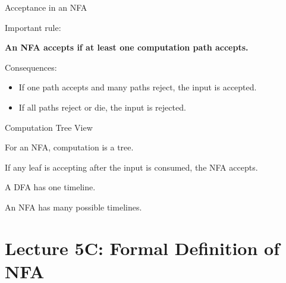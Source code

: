 \documentclass[10pt,aspectratio=169]{beamer}
\begin{document}
\begin{frame}{Acceptance in an NFA}

Important rule:

\vspace{1em}

\begin{center}
\textbf{An NFA accepts if at least one computation path accepts.}
\end{center}

\vspace{1em}

Consequences:

\begin{itemize}
\item If one path accepts and many paths reject, the input is accepted.
\item If all paths reject or die, the input is rejected.
\end{itemize}

\end{frame}

\begin{frame}{Computation Tree View}

For an NFA, computation is a tree.

\begin{center}
\end{center}

\vspace{0.5em}

If any leaf is accepting after the input is consumed, the NFA accepts.

\end{frame}

\begin{frame}[standout]
A DFA has one timeline.

An NFA has many possible timelines.
\end{frame}

\section{Lecture 5C: Formal Definition of NFA}
\end{document}
